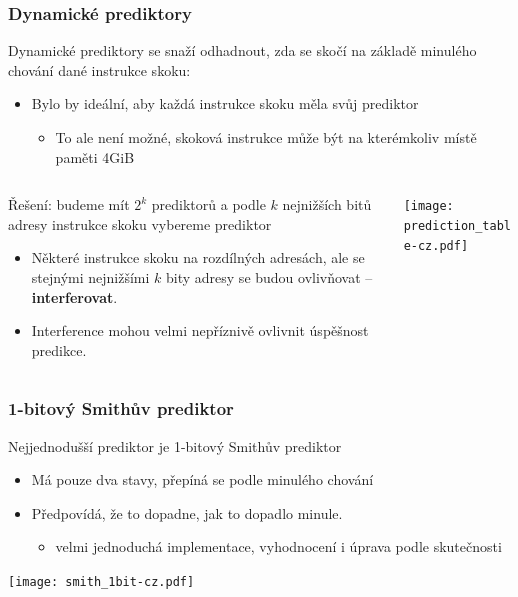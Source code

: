 \documentclass{beamer}
\begin{document}
\begin{frame}
\frametitle{Dynamické prediktory}

\small
Dynamické prediktory se snaží odhadnout, zda se skočí na základě minulého chování dané instrukce skoku:
\begin{itemize}
\item Bylo by ideální, aby každá instrukce skoku měla svůj prediktor
\begin{itemize}
\small
\item To ale není možné, skoková instrukce může být na kterémkoliv místě paměti 4GiB
\end{itemize}
\end{itemize}


\begin{columns}[T]
\begin{column}{0.5\textwidth}
\small
Řešení: budeme mít $2^k$ prediktorů a podle $k$ nejnižších bitů adresy instrukce skoku vybereme prediktor
\begin{itemize}
\item Některé instrukce skoku na rozdílných adresách, ale se stejnými nejnižšími $k$ bity adresy se budou ovlivňovat -- \textbf{interferovat}.
\item Interference mohou velmi nepříznivě ovlivnit úspěšnost predikce.
\end{itemize}
\end{column}
\begin{column}{0.5\textwidth}
\texttt{[image: prediction\_table-cz.pdf]}
\end{column}
\end{columns}

\end{frame}


\begin{frame}
\frametitle{1-bitový Smithův prediktor}

Nejjednodušší prediktor je 1-bitový Smithův prediktor
\begin{itemize}
\item Má pouze dva stavy, přepíná se podle minulého chování
\item Předpovídá, že to dopadne, jak to dopadlo minule.
\begin{itemize}
\item velmi jednoduchá implementace, vyhodnocení i úprava podle skutečnosti
\end{itemize}
\end{itemize}

\begin{center}
\texttt{[image: smith\_1bit-cz.pdf]}
\end{center}

\end{frame}
\end{document}
